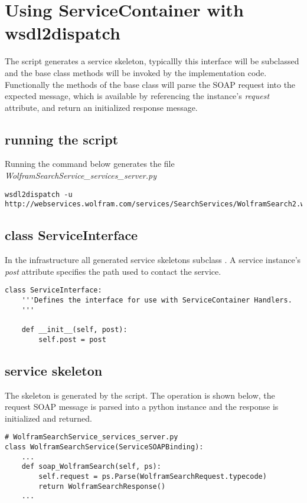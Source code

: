 \chapter{Using ServiceContainer with wsdl2dispatch}
The \WPYDIS{} script generates a service skeleton, typicallly this interface will be subclassed and the 
base class methods will be invoked by the implementation code.  Functionally the methods of the base class will parse the SOAP request into the expected message, which is available by referencing the instance's {\it request} attribute, and return an initialized response message.

\section{running the script}
Running the command below generates the file \emph{WolframSearchService_services_server.py}

\begin{verbatim}
wsdl2dispatch -u http://webservices.wolfram.com/services/SearchServices/WolframSearch2.wsdl
\end{verbatim}

\section{class ServiceInterface}
In the  infrastructure all generated service skeletons 
subclass .  A service instance's \emph{post} attribute 
specifies the path used to contact the service.

\begin{verbatim}
class ServiceInterface:
    '''Defines the interface for use with ServiceContainer Handlers.
    '''

    def __init__(self, post):
        self.post = post

\end{verbatim}
\section{service skeleton}
The skeleton is generated by the \WPYDIS{} script.  The  operation is 
shown below, the request SOAP message is parsed into a python instance and the response 
is initialized and returned.


\begin{verbatim}
# WolframSearchService_services_server.py
class WolframSearchService(ServiceSOAPBinding):
    ...
    def soap_WolframSearch(self, ps):
        self.request = ps.Parse(WolframSearchRequest.typecode)
        return WolframSearchResponse()
    ...
\end{verbatim}


